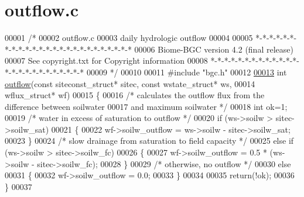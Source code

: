\hypertarget{outflow_8c_source}{}\section{outflow.\+c}
\label{outflow_8c_source}

\begin{DoxyCode}
00001 \textcolor{comment}{/* }
00002 \textcolor{comment}{outflow.c}
00003 \textcolor{comment}{daily hydrologic outflow}
00004 \textcolor{comment}{}
00005 \textcolor{comment}{*-*-*-*-*-*-*-*-*-*-*-*-*-*-*-*-*-*-*-*-*-*-*-*-*}
00006 \textcolor{comment}{Biome-BGC version 4.2 (final release)}
00007 \textcolor{comment}{See copyright.txt for Copyright information}
00008 \textcolor{comment}{*-*-*-*-*-*-*-*-*-*-*-*-*-*-*-*-*-*-*-*-*-*-*-*-*}
00009 \textcolor{comment}{*/}
00010 
00011 \textcolor{preprocessor}{#include "bgc.h"}
00012 
\hypertarget{outflow_8c_source_l00013}{}\hyperlink{outflow_8c_a7114cdaa68100f134ada9732a625c6a9}{00013} \textcolor{keywordtype}{int} \hyperlink{outflow_8c_a7114cdaa68100f134ada9732a625c6a9}{outflow}(\textcolor{keyword}{const} siteconst\_struct* sitec, \textcolor{keyword}{const} wstate\_struct* ws,
00014 wflux\_struct* wf)
00015 \{
00016     \textcolor{comment}{/* calculates the outflow flux from the difference between soilwater}
00017 \textcolor{comment}{    and maximum soilwater */}
00018     \textcolor{keywordtype}{int} ok=1;
00019     \textcolor{comment}{/* water in excess of saturation to outflow */}
00020     \textcolor{keywordflow}{if} (ws->soilw > sitec->soilw\_sat)  
00021     \{
00022         wf->soilw\_outflow = ws->soilw - sitec->soilw\_sat;
00023     \}
00024     \textcolor{comment}{/* slow drainage from saturation to field capacity */}
00025     \textcolor{keywordflow}{else} \textcolor{keywordflow}{if} (ws->soilw > sitec->soilw\_fc)
00026     \{
00027         wf->soilw\_outflow = 0.5 * (ws->soilw - sitec->soilw\_fc);
00028     \}
00029     \textcolor{comment}{/* otherwise, no outflow */}
00030     \textcolor{keywordflow}{else}
00031     \{
00032         wf->soilw\_outflow = 0.0;
00033     \}
00034 
00035     \textcolor{keywordflow}{return}(!ok);
00036 \}
00037 
\end{DoxyCode}
